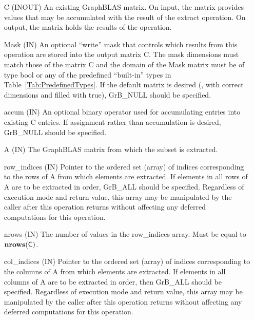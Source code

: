 \begin{itemize}[leftmargin=1.1in]
    \item[{\sf C}]    ({\sf INOUT}) An existing GraphBLAS matrix. On input,
    the matrix provides values that may be accumulated with the result of the
    extract operation.  On output, the matrix holds the results of the
    operation.

    \item[{\sf Mask}] ({\sf IN}) An optional ``write'' mask that controls which
    results from this operation are stored into the output matrix {\sf C}. The 
    mask dimensions must match those of the matrix {\sf C} and the domain of the 
    {\sf Mask} matrix must be of type {\sf bool} or any of the predefined 
    ``built-in'' types in Table~\ref{Tab:PredefinedTypes}.  If the default
    matrix is desired (\ie, with correct dimensions and filled with {\sf true}), 
    {\sf GrB\_NULL} should be specified.

    \item[{\sf accum}] ({\sf IN}) An optional binary operator used for accumulating
    entries into existing {\sf C} entries.
    If assignment rather than accumulation is
    desired, {\sf GrB\_NULL} should be specified.

    \item[{\sf A}]     ({\sf IN})  The GraphBLAS matrix from which the subset
    is extracted.

    \item[{\sf row\_indices}] ({\sf IN}) Pointer to the ordered set (array) of 
    indices corresponding to the rows of {\sf A} from which elements are 
    extracted.  If elements in all rows of {\sf A} are to be extracted in order, 
    {\sf GrB\_ALL} should be specified.  Regardless of execution mode and return
    value, this array may be manipulated by the caller after this operation 
    returns without affecting any deferred computations for this operation.
    
    \item[{\sf nrows}] ({\sf IN}) The number of values in the {\sf row\_indices}
    array.  Must be equal to $\bold{nrows}({\sf C})$.
    
    \item[{\sf col\_indices}] ({\sf IN}) Pointer to the ordered set (array) of 
    indices corresponding to the columns of {\sf A} from which elements are 
    extracted.  If elements in all columns of {\sf A} are to be extracted in order, 
    then {\sf GrB\_ALL} should be specified.  Regardless of execution mode and return
    value, this array may be manipulated by the caller after this operation 
    returns without affecting any deferred computations for this operation.
    

\end{itemize}
